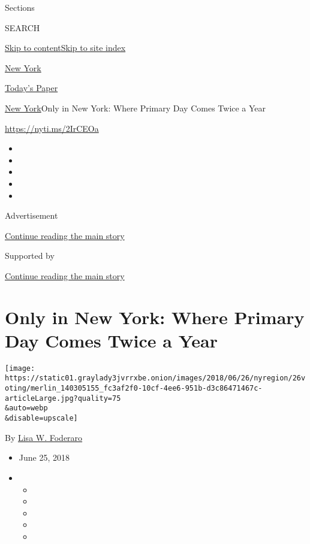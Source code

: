 Sections

SEARCH

\protect\hyperlink{site-content}{Skip to
content}\protect\hyperlink{site-index}{Skip to site index}

\href{https://www.nytimes3xbfgragh.onion/section/nyregion}{New York}

\href{https://myaccount.nytimes3xbfgragh.onion/auth/login?response_type=cookie\&client_id=vi}{}

\href{https://www.nytimes3xbfgragh.onion/section/todayspaper}{Today's
Paper}

\href{/section/nyregion}{New York}\textbar{}Only in New York: Where
Primary Day Comes Twice a Year

\url{https://nyti.ms/2IrCEOa}

\begin{itemize}
\item
\item
\item
\item
\item
\end{itemize}

Advertisement

\protect\hyperlink{after-top}{Continue reading the main story}

Supported by

\protect\hyperlink{after-sponsor}{Continue reading the main story}

\hypertarget{only-in-new-york-where-primary-day-comes-twice-a-year}{%
\section{Only in New York: Where Primary Day Comes Twice a
Year}\label{only-in-new-york-where-primary-day-comes-twice-a-year}}

\texttt{[image: https://static01.graylady3jvrrxbe.onion/images/2018/06/26/nyregion/26voting/merlin\_140305155\_fc3af2f0-10cf-4ee6-951b-d3c86471467c-articleLarge.jpg?quality=75\\\&auto=webp\\\&disable=upscale]}

By \href{https://www.nytimes3xbfgragh.onion/by/lisa-w-foderaro}{Lisa W.
Foderaro}

\begin{itemize}
\item
  June 25, 2018
\item
  \begin{itemize}
  \item
  \item
  \item
  \item
  \item
  \end{itemize}
\end{itemize}

